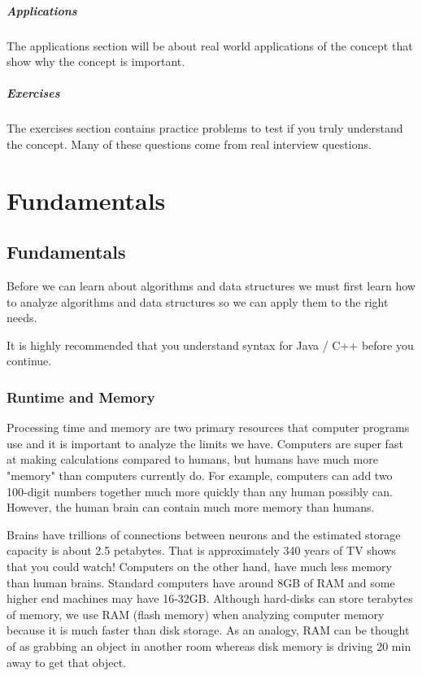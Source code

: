 \documentclass[11pt,oneside]{book}
\begin{document}
\subsubsection{Applications}

The applications section will be about real world applications of the concept that show why the concept is important.

\subsubsection{Exercises}

The exercises section contains practice problems to test if you truly understand the concept. Many of these questions come from real interview questions.

\part{ Fundamentals }
    \chapter{ Fundamentals }
        

Before we can learn about algorithms and data structures we must first learn how to analyze algorithms and data structures so we can apply them to the right needs.

It is highly recommended that you understand syntax for Java / C++ before you continue.


        \section{ Runtime and Memory }
        

Processing time and memory are two primary resources that computer programs use and it is important to analyze the limits we have. Computers are super fast at making calculations compared to humans, but humans have much more "memory" than computers currently do. For example, computers can add two 100-digit numbers together much more quickly than any human possibly can. However, the human brain can contain much more memory than humans.

Brains have trillions of connections between neurons and the estimated storage capacity is about 2.5 petabytes. That is approximately 340 years of TV shows that you could watch! Computers on the other hand, have much less memory than human brains. Standard computers have around 8GB of RAM and some higher end machines may have 16-32GB. Although hard-disks can store terabytes of memory, we use RAM (flash memory) when analyzing computer memory because it is much faster than disk storage. As an analogy, RAM can be thought of as grabbing an object in another room whereas disk memory is driving 20 min away to get that object.
\end{document}
